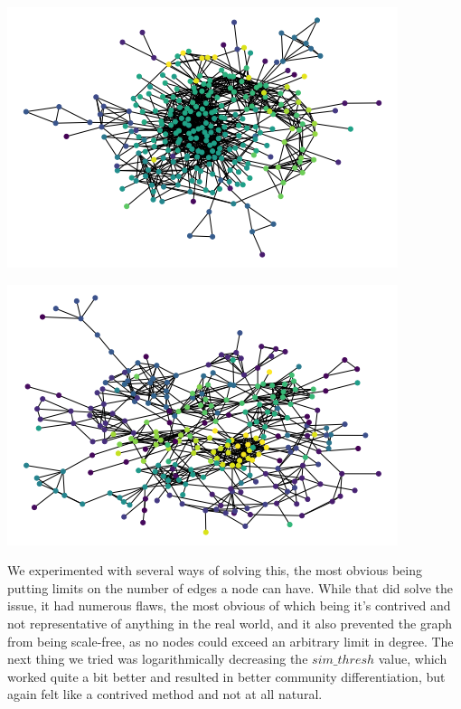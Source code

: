 \documentclass[12pt,twoside]{report}
\begin{document}
\begin{center}
\begin{minipage}{0.45\linewidth}
\includegraphics[width=\linewidth]{figures/saturated_graph.png}
\end{minipage}%
\hfill
\begin{minipage}{0.45\linewidth}
\includegraphics[width=\linewidth]{figures/fixed_graph.png}
\end{minipage}
\end{center}


We experimented with several ways of solving this, the most obvious being putting limits on the number of edges a node can have. While that did solve the issue, it had numerous flaws, the most obvious of which being it's contrived and not representative of anything in the real world, and it also prevented the graph from being scale-free, as no nodes could exceed an arbitrary limit in degree. The next thing we tried was logarithmically decreasing the $sim\_thresh$ value, which worked quite a bit better and resulted in better community differentiation, but again felt like a contrived method and not at all natural. \\
\end{document}
